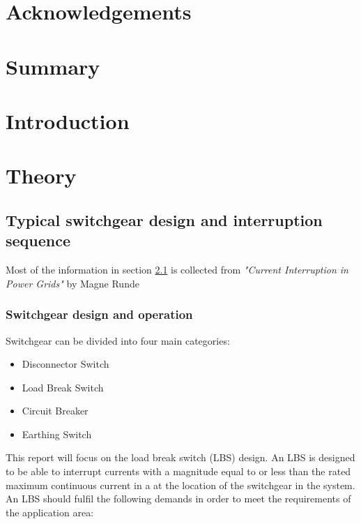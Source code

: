 \documentclass[10pt,b5paper,twoside]{article}
\begin{document}
\thispagestyle{empty}
\cleardoublepage
\section*{Acknowledgements}
\setcounter{page}{1}

\cleardoublepage
\section*{Summary}

\cleardoublepage
\setcounter{page}{1}
\tableofcontents
\cleardoublepage

\section{Introduction}
\cleardoublepage

\section{Theory}
\subsection{Typical switchgear design and interruption sequence} \label{sec:genDes}
Most of the information in section \ref{sec:genDes} is collected from \textit{"Current Interruption in Power Grids"} by Magne Runde \cite{bib:HVEbreak} \newline

\subsubsection{Switchgear design and operation} \label{sec:InterruptCurrent}
Switchgear can be divided into four main categories:
\begin{itemize}
\item Disconnector Switch
\item Load Break Switch
\item Circuit Breaker
\item Earthing Switch
\end{itemize}

This report will focus on the load break switch (LBS) design. An LBS is designed to be able to interrupt currents with a magnitude equal to or less than the rated maximum continuous current in a at the location of the switchgear in the system. An LBS should fulfil the following demands in order to meet the requirements of the application area:
\end{document}
